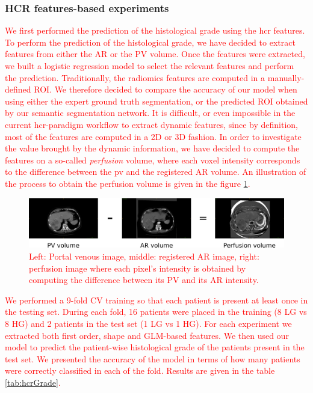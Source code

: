 \subsubsection{HCR features-based experiments}
\textcolor{red}
{
We first performed the prediction of the histological grade using the \ac{hcr} features.
To perform the prediction of the histological grade, we have decided to extract features from either the AR or the PV volume.
Once the features were extracted, we built a logistic regression model to select the relevant features and perform the prediction.
Traditionally, the radiomics features are computed in a manually-defined ROI. We therefore decided to compare the accuracy of our model when using either the expert ground truth segmentation, or the predicted ROI obtained by our semantic segmentation network.
It is difficult, or even impossible in the current \ac{hcr}-paradigm workflow to extract dynamic features, since by definition, most of the features are computed in a 2D or 3D fashion. 
In order to investigate the value brought by the dynamic information, we have decided to compute the features on a so-called \textit{perfusion} volume, where each voxel intensity corresponds to the difference between the \ac{pv} and the registered AR volume. An illustration of the process to obtain the perfusion volume is given in the figure \ref{fig:perfusion}.
\begin{figure}
\begin{mdframed}[backgroundcolor=blue!50,linecolor=blue!50]
	\centering
	\includegraphics[width=0.9\linewidth]{Contributions/images/perfusion}
	\caption{Left: Portal venous image, middle: registered AR image, right: perfusion image where each pixel's intensity is obtained by computing the difference between its PV and its AR intensity.}
	\label{fig:perfusion}
\end{mdframed}
\end{figure}
We performed a 9-fold CV training so that each patient is present at least once in the testing set. During each fold, 16 patients were placed in the training (8 LG vs 8 HG) and 2 patients in the test set (1 LG vs 1 HG). For each experiment we extracted both first order, shape and GLM-based features. We then used our model to predict the patient-wise histological grade of the patients present in the test set. We presented the accuracy of the model in terms of how many patients were correctly classified in each of the fold. Results are given in the table \ref{tab:hcrGrade}.
}
